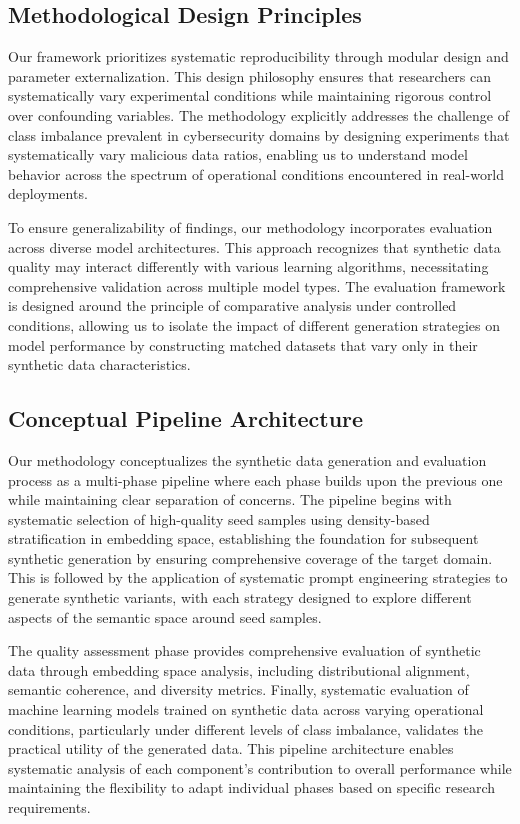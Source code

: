 \subsection{Methodological Design Principles}

Our framework prioritizes systematic reproducibility through modular design and parameter externalization. This design philosophy ensures that researchers can systematically vary experimental conditions while maintaining rigorous control over confounding variables. The methodology explicitly addresses the challenge of class imbalance prevalent in cybersecurity domains by designing experiments that systematically vary malicious data ratios, enabling us to understand model behavior across the spectrum of operational conditions encountered in real-world deployments.

To ensure generalizability of findings, our methodology incorporates evaluation across diverse model architectures. This approach recognizes that synthetic data quality may interact differently with various learning algorithms, necessitating comprehensive validation across multiple model types. The evaluation framework is designed around the principle of comparative analysis under controlled conditions, allowing us to isolate the impact of different generation strategies on model performance by constructing matched datasets that vary only in their synthetic data characteristics.

\subsection{Conceptual Pipeline Architecture}

Our methodology conceptualizes the synthetic data generation and evaluation process as a multi-phase pipeline where each phase builds upon the previous one while maintaining clear separation of concerns. The pipeline begins with systematic selection of high-quality seed samples using density-based stratification in embedding space, establishing the foundation for subsequent synthetic generation by ensuring comprehensive coverage of the target domain. This is followed by the application of systematic prompt engineering strategies to generate synthetic variants, with each strategy designed to explore different aspects of the semantic space around seed samples.

The quality assessment phase provides comprehensive evaluation of synthetic data through embedding space analysis, including distributional alignment, semantic coherence, and diversity metrics. Finally, systematic evaluation of machine learning models trained on synthetic data across varying operational conditions, particularly under different levels of class imbalance, validates the practical utility of the generated data. This pipeline architecture enables systematic analysis of each component's contribution to overall performance while maintaining the flexibility to adapt individual phases based on specific research requirements.

